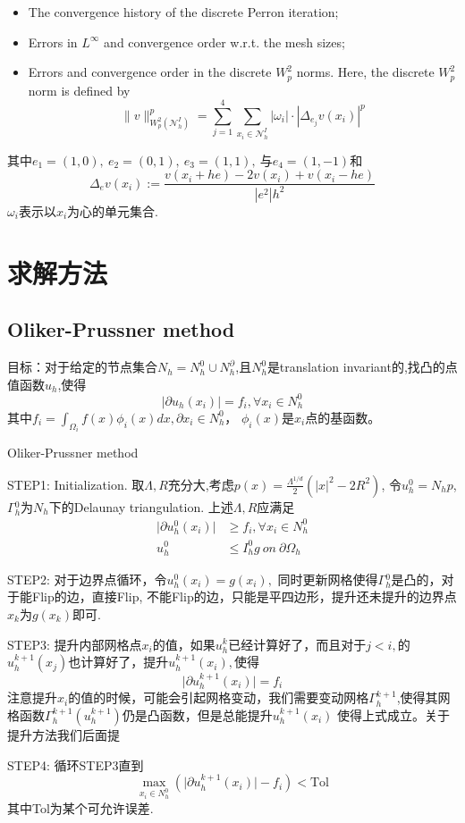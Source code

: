 \documentclass[11pt]{article}
\begin{document}
\begin{itemize}
\item The convergence history of the discrete Perron iteration;
\item Errors in $L^\infty{}$ and convergence order w.r.t. the mesh sizes;
\item Errors and convergence order in the discrete $W_p^2$ norms. Here, the discrete $W_p^2$ norm is defined by
$$\|v\|_{W_{p}^{2}\left(\mathcal{N}_{h}^{I}\right)}^{p}=\sum_{j=1}^{4} \sum_{x_{i} \in \mathcal{N}_{h}^{I}}\left|\omega_{i}\right| \cdot\left|\Delta_{e_{j}} v\left(x_{i}\right)\right|^{p}$$
\end{itemize}
其中$e_1=(1,0),\ e_2=(0,1),\ e_3=(1,1),\ $与$e_4=(1,-1)$和
$$\Delta_{e} v\left(x_{i}\right):=\frac{v\left(x_{i}+h e\right)-2 v\left(x_{i}\right)+v\left(x_{i}-h e\right)}{\left|e^{2}\right| h^{2}}$$
$\omega_{i}$表示以$x_i$为心的单元集合.
\section{求解方法}
\subsection{Oliker-Prussner method}
目标：对于给定的节点集合$N_h=N_h^0\cup N_h^\partial$,且$N_h^0$是translation invariant的,找凸的点值函数$u_h$,使得
$$\vert{\partial u_h(x_i)}\vert=f_i, \forall x_i\in N_h^0$$
其中$f_i=\int_{\Omega_i}f(x)\phi_i(x)dx , \partial x_i\in N_h^0$，
$\phi_i(x)$是$x_i$点的基函数。

\begin{algorithm}[H]
\caption{Oliker-Prussner method} 
\begin{algorithmic}[]
\STATE STEP1: Initialization. 取$\Lambda,R$充分大,考虑$p(x)=\frac{\Lambda^{1/d}}{2}(\vert{x}\vert^2-2R^2)$, 令$u_h^0=N_hp$, $\Gamma{}_h^0$为$N_h$下的Delaunay triangulation.
上述$\Lambda, R$应满足
$$\begin{aligned}
\vert{\partial u_h^0(x_i)}\vert&\geqslant f_i,\forall x_i\in N_h^0\\
u_h^0&\leqslant I_h^0g\ on\ \partial\Omega_h
\end{aligned}$$

\STATE STEP2:  对于边界点循环，令$u_h^0(x_i)=g(x_i),$  同时更新网格使得$\Gamma{}_h^0$是凸的，对于能Flip的边，直接Flip, 不能Flip的边，只能是平四边形，提升还未提升的边界点$x_k$为$g(x_k)$即可.

\STATE STEP3: 提升内部网格点$x_i$的值，如果$u_h^k$已经计算好了，而且对于$j<i,$的$u^{k+1}_h(x_j)$也计算好了，提升$u_h^{k+1}(x_i),$使得
$$\vert{\partial u_h^{k+1}(x_i)}\vert=f_i$$
注意提升$x_i$的值的时候，可能会引起网格变动，我们需要变动网格$\Gamma{}^{k+1}_h$,使得其网格函数$\Gamma{}^{k+1}_h(u^{k+1}_h)$仍是凸函数，但是总能提升$u_h^{k+1}(x_i)$
使得上式成立。关于提升方法我们后面提

\STATE STEP4: 循环STEP3直到
$$\max_{x_i\in N_h^0}(\vert{\partial u_h^{k+1}(x_i)}\vert-f_i)< \text{Tol}$$
其中Tol为某个可允许误差.
\end{algorithmic}
\end{algorithm}
\end{document}
